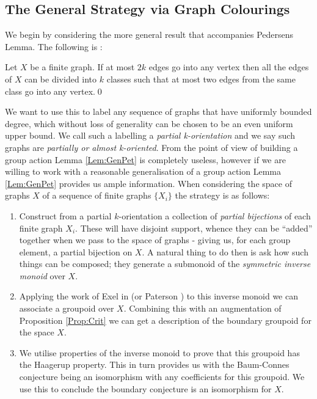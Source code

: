 \begin{conjecture}
\subsection{The General Strategy via Graph Colourings}

We begin by considering the more general result that accompanies Pedersens Lemma. The following is \cite[Theorem 6, Chapter XI]{MR1035708}:

\begin{lemma}\label{Lem:GenPet}
Let $X$ be a finite graph. If at most $2k$ edges go into any vertex then all the edges of $X$ can be divided into $k$ classes such that at most two edges from the same class go into any vertex.\qed
\end{lemma}

We want to use this to label any sequence of graphs that have uniformly bounded degree, which without loss of generality can be chosen to be an even uniform upper bound. We call such a labelling a \textit{partial k-orientation} and we say such graphs are \textit{partially or almost k-oriented}. From the point of view of building a group action Lemma \ref{Lem:GenPet} is completely useless, however if we are willing to work with a reasonable generalisation of a group action Lemma \ref{Lem:GenPet} provides us ample information. When considering the space of graphs $X$ of a sequence of finite graphs $\lbrace X_{i} \rbrace$ the strategy is as follows: 
\begin{enumerate}
\item Construct from a partial $k$-orientation a collection of \textit{partial bijections} of each finite graph $X_{i}$. These will have disjoint support, whence they can be ``added'' together when we pass to the space of graphs - giving us, for each group element, a partial bijection on $X$. A natural thing to do then is ask how such things can be composed; they generate a submonoid of the \textit{symmetric inverse monoid} over $X$.

\item Applying the work of Exel in \cite{MR2419901} (or Paterson \cite{MR1724106}) to this inverse monoid we can associate a groupoid over $X$. Combining this with an augmentation of Proposition \ref{Prop:Crit} we can get a description of the boundary groupoid for the space $X$.

\item We utilise properties of the inverse monoid to prove that this groupoid has the Haagerup property. This in turn provides us with the Baum-Connes conjecture being an isomorphism with any coefficients for this groupoid. We use this to conclude the boundary conjecture is an isomorphism for $X$.
\end{enumerate}


\end{conjecture}
